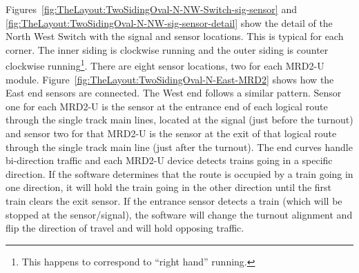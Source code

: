 Figures~\ref{fig:TheLayout:TwoSidingOval-N-NW-Switch-sig-sensor} and
\ref{fig:TheLayout:TwoSidingOval-N-NW-sig-sensor-detail} show the
detail of the North West Switch with the signal and sensor locations.
This is typical for each corner. The inner siding is clockwise running
and the outer siding is counter clockwise running\footnote{This happens
to correspond to ``right hand'' running.}.  There are eight sensor
locations, two for each MRD2-U module. 
Figure~\ref{fig:TheLayout:TwoSidingOval-N-East-MRD2} shows how the
East end sensors are connected.  The West end follows a similar
pattern. Sensor one for each MRD2-U is the sensor at the entrance end
of each logical route through the single track main lines, located at
the signal (just before the turnout) and sensor two for that MRD2-U is
the sensor at the exit of that logical route through the single track
main line (just after the turnout). The end curves handle bi-direction
traffic and each MRD2-U device detects trains going in a specific
direction.  If the software determines that the route is occupied by a
train going in one direction, it will hold the train going in the other
direction until the first train clears the exit sensor. If the entrance
sensor detects a train (which will be stopped at the sensor/signal), the
software will change the turnout alignment and flip the direction of
travel and will hold opposing traffic. 

